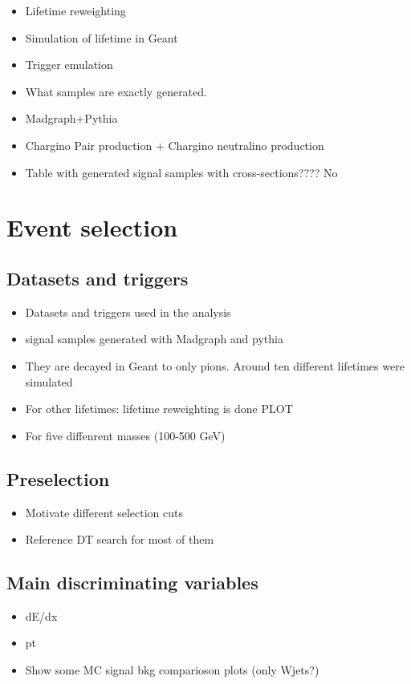 \begin{itemize}
\item Lifetime reweighting
\item Simulation of lifetime in Geant
\item Trigger emulation
\item What samples are exactly generated.
\item Madgraph+Pythia
\item Chargino Pair production + Chargino neutralino production
\item Table with generated signal samples with cross-sections???? No
\end{itemize}

\section{Event selection}
\label{sec:EventSelection}
\subsection{Datasets and triggers}
\begin{itemize}
\item Datasets and triggers used in the analysis
\item signal samples generated with Madgraph and pythia
\item They are decayed in Geant to only pions. Around ten different lifetimes were simulated
\item For other lifetimes: lifetime reweighting is done PLOT
\item For five diffenrent masses (100-500 GeV) 
\end{itemize}
\subsection{Preselection}
\begin{itemize}
\item Motivate different selection cuts
\item Reference DT search for most of them
\end{itemize}
\subsection{Main discriminating variables}
\begin{itemize}
\item dE/dx
\item pt
\item Show some MC signal bkg comparioson plots (only Wjets?)
\end{itemize}


